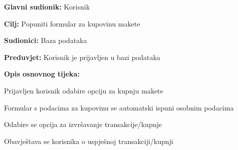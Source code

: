 					\noindent {}
				\begin{packed_item}
					
					\item \textbf{Glavni sudionik: }Korisnik
					\item  \textbf{Cilj:} Popuniti formular za kupovinu makete
					\item  \textbf{Sudionici:} Baza podataka
					\item  \textbf{Preduvjet:} Korisnik je prijavljen u bazi podataka
					\item  \textbf{Opis osnovnog tijeka:}
						
					\item[] \begin{packed_enum}
							
						\item Prijavljen korisnik odabire opciju za kupnju makete
						\item Formular s podacima za kupovinu se automatski ispuni osobnim podacima
						\item Odabire se opcija za izvršavanje transakcije/kupnje
						\item Obavještava se korisnika o uspješnoj transakciji/kupnji
					\end{packed_enum}
				\end{packed_item}
				
